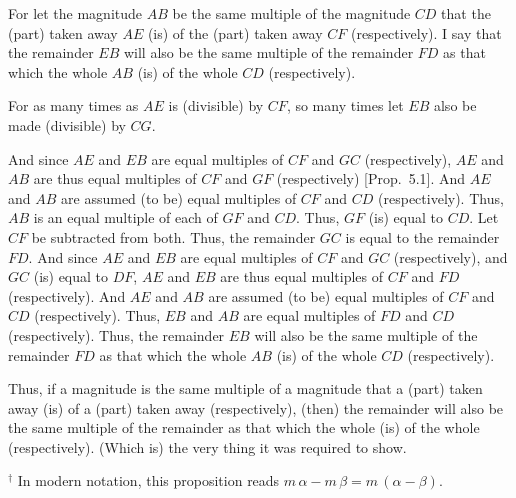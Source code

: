 \begin{Parallel}{}{}
{\epsfysize=0.7in
\centerline{}

For let the magnitude $AB$ be the same multiple of the magnitude $CD$ that
the (part)  taken away $AE$ (is) of the (part)  taken away $CF$ (respectively).
I say that the remainder $EB$ will also be the same multiple
of the remainder $FD$ as that which the whole $AB$ (is) of the whole
$CD$ (respectively).

For as many times as $AE$ is (divisible) by $CF$, so many times let $EB$
also be made (divisible) by $CG$.

And since $AE$ and $EB$ are equal multiples of $CF$ and $GC$ (respectively),
$AE$ and $AB$ are thus equal multiples of $CF$ and $GF$ (respectively) 
 [Prop.~5.1]. And  $AE$ and $AB$ are assumed (to be) equal multiples of $CF$ and $CD$ (respectively). Thus,
 $AB$ is an equal multiple of each of $GF$ and $CD$. Thus, $GF$ (is) equal to
 $CD$. Let $CF$ be subtracted from both. Thus, the remainder $GC$ is
 equal to the remainder $FD$. And since $AE$ and $EB$ are equal multiples
 of $CF$ and $GC$ (respectively), and $GC$ (is) equal to $DF$, $AE$  and $EB$ are thus
 equal multiples of $CF$ and $FD$ (respectively). And $AE$ and $AB$ are assumed
 (to be) equal multiples of $CF$ and $CD$ (respectively). Thus, $EB$ and $AB$ are
 equal multiples of $FD$ and $CD$ (respectively). Thus, the remainder
 $EB$ will also be the same multiple of the remainder $FD$
 as that which the whole $AB$ (is) of the whole $CD$ (respectively).
 
 Thus, if a magnitude is the same multiple of a magnitude
that a (part) taken away (is) of a (part) taken away (respectively), (then) the remainder will
also be the same multiple of the remainder as that  which the whole (is) of the whole (respectively).
  (Which is) the very thing it was required to show.}
\end{Parallel}
{\footnotesize \noindent$^\dag$ In modern notation, this
proposition reads $m\,\alpha-m\,\beta=m\,(\alpha-\beta)$.}

